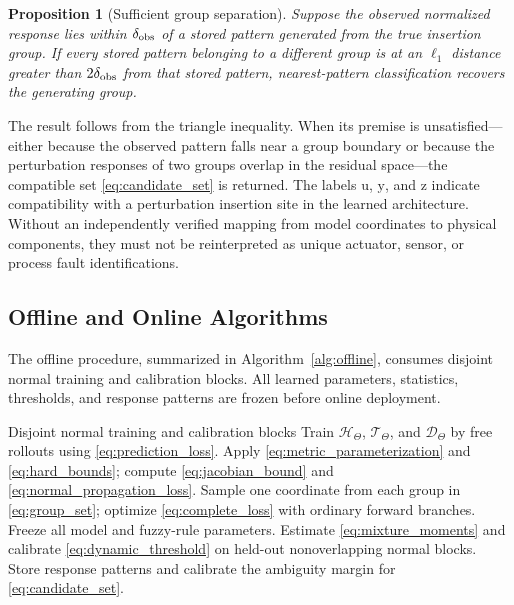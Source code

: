 \documentclass[journal]{IEEEtran}
\newtheorem{proposition}{Proposition}
\newcommand{\1}{\bm 1}
\begin{document}
\begin{proposition}[Sufficient group separation]
\label{prop:isolation}
Suppose the observed normalized response lies within $\delta_{\rm obs}$ of a
stored pattern generated from the true insertion group. If every stored
pattern belonging to a different group is at an $\ell_1$ distance greater than
$2\delta_{\rm obs}$ from that stored pattern, nearest-pattern classification
recovers the generating group.
\end{proposition}

The result follows from the triangle inequality. When its premise is
unsatisfied---either because the observed pattern falls near a group boundary or
because the perturbation responses of two groups overlap in the residual
space---the compatible set \eqref{eq:candidate_set} is returned. The
labels $\mathrm u$, $\mathrm y$, and $\mathrm z$ indicate compatibility with a
perturbation insertion site in the learned architecture. Without an
independently verified mapping from model coordinates to physical components,
they must not be reinterpreted as unique actuator, sensor, or process fault
identifications.

\subsection{Offline and Online Algorithms}
The offline procedure, summarized in Algorithm~\ref{alg:offline}, consumes
disjoint normal training and calibration blocks. All learned parameters,
statistics, thresholds, and response patterns are frozen before online
deployment.

\begin{algorithm}[H]
\caption{Normal-Data Offline Design}
\label{alg:offline}
\begin{algorithmic}[1]
\Require Disjoint normal training and calibration blocks
\State Train $\mathcal H_\Theta$, $\mathcal T_\Theta$, and
$\mathcal D_\Theta$ by free rollouts using \eqref{eq:prediction_loss}.
\State Apply \eqref{eq:metric_parameterization} and \eqref{eq:hard_bounds};
compute \eqref{eq:jacobian_bound} and \eqref{eq:normal_propagation_loss}.
\State Sample one coordinate from each group in \eqref{eq:group_set};
optimize \eqref{eq:complete_loss} with ordinary forward branches.
\State Freeze all model and fuzzy-rule parameters.
\State Estimate \eqref{eq:mixture_moments} and calibrate
\eqref{eq:dynamic_threshold} on held-out nonoverlapping normal blocks.
\State Store response patterns and calibrate the ambiguity margin for
\eqref{eq:candidate_set}.
\end{algorithmic}
\end{algorithm}
\end{document}
